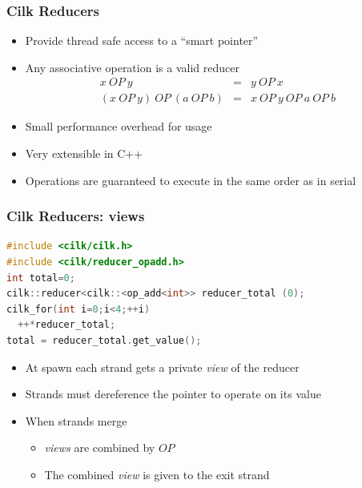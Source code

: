 \documentclass[fleqn,xcolor=table,10pt,final]{beamer}
\begin{document}
\begin{frame}
  \frametitle{Cilk Reducers}
  \begin{itemize}
    \itemsep 0.5cm
    \item Provide thread safe access to a ``smart pointer''
    \item Any associative operation is a valid reducer
      \begin{eqnarray*}
        x\ OP\ y &=&  y\ OP\ x \\
        \left(x\ OP\ y\right)\ OP\ \left(a\ OP\ b\right) &=& x\ OP\ y\ OP\ a\ OP\ b
      \end{eqnarray*}
    \item Small performance overhead for usage
    \item Very extensible in C++
    \item Operations are guaranteed to execute in the same order as in serial
  \end{itemize}
\end{frame}

\begin{frame}[fragile]
  \frametitle{Cilk Reducers: views}
  \begin{lstlisting}[language=C++,basicstyle=\scriptsize]
#include <cilk/cilk.h>
#include <cilk/reducer_opadd.h>
int total=0;
cilk::reducer<cilk::<op_add<int>> reducer_total (0);
cilk_for(int i=0;i<4;++i)
  ++*reducer_total;
total = reducer_total.get_value();
  \end{lstlisting}
  \begin{itemize}
    \itemsep 0.4cm
    \item At spawn each strand gets a private \emph{view} of the reducer
    \item Strands must dereference the pointer to operate on its value
    \item When strands merge
      \begin{itemize}
        \item \emph{views} are combined by $OP$
        \item The combined \emph{view} is given to the exit strand
      \end{itemize}
  \end{itemize}
\end{frame}
\end{document}
